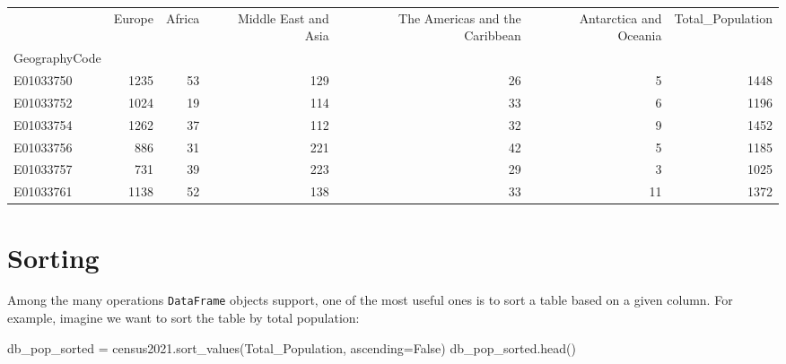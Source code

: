 \documentclass[
  letterpaper,
  DIV=11,
  numbers=noendperiod]{scrreprt}
\newenvironment{Shaded}{\begin{snugshade}}{\end{snugshade}}
\newcommand{\NormalTok}[1]{\textcolor[rgb]{0.00,0.23,0.31}{#1}}
\newcommand{\OperatorTok}[1]{\textcolor[rgb]{0.37,0.37,0.37}{#1}}
\newcommand{\StringTok}[1]{\textcolor[rgb]{0.13,0.47,0.30}{#1}}
\newcommand{\VariableTok}[1]{\textcolor[rgb]{0.07,0.07,0.07}{#1}}
\begin{document}
\begin{tabular}{lrrrrrr}
\toprule
{} &  Europe &  Africa &  Middle East and Asia &  The Americas and the Caribbean &  Antarctica and Oceania &  Total\_Population \\
GeographyCode &         &         &                       &                                 &                         &                   \\
\midrule
E01033750     &    1235 &      53 &                   129 &                              26 &                       5 &              1448 \\
E01033752     &    1024 &      19 &                   114 &                              33 &                       6 &              1196 \\
E01033754     &    1262 &      37 &                   112 &                              32 &                       9 &              1452 \\
E01033756     &     886 &      31 &                   221 &                              42 &                       5 &              1185 \\
E01033757     &     731 &      39 &                   223 &                              29 &                       3 &              1025 \\
E01033761     &    1138 &      52 &                   138 &                              33 &                      11 &              1372 \\
\bottomrule
\end{tabular}

\section*{Sorting}\label{sorting}


Among the many operations \texttt{DataFrame} objects support, one of the
most useful ones is to sort a table based on a given column. For
example, imagine we want to sort the table by total population:

\begin{Shaded}
\begin{Highlighting}[]
\NormalTok{db\_pop\_sorted }\OperatorTok{=}\NormalTok{ census2021.sort\_values(}\StringTok{\textquotesingle{}Total\_Population\textquotesingle{}}\NormalTok{, ascending}\OperatorTok{=}\VariableTok{False}\NormalTok{)}
\NormalTok{db\_pop\_sorted.head()}
\end{Highlighting}
\end{Shaded}
\end{document}

